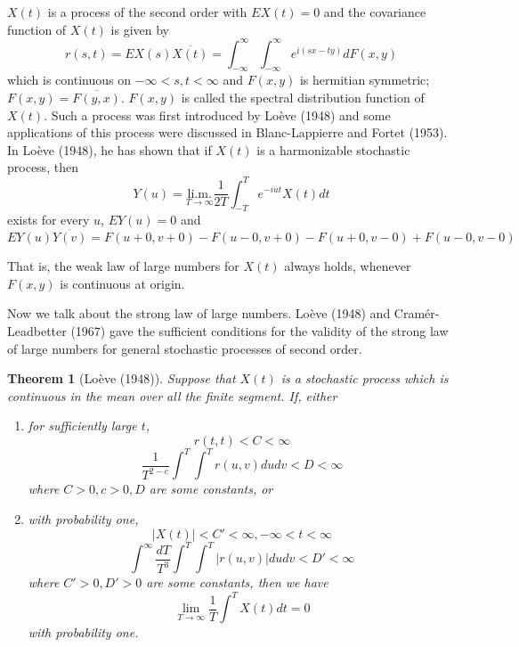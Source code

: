 \documentclass{article}
\newtheorem{theorem}{Theorem}
\newtheorem{enumerate}{Enumerate}
\begin{document}
$X(t)$ is a process of the second order with $EX(t)=0$ and the covariance function of $X(t)$ is given by
\begin{equation}\label{eq:5}
r(s,t) = EX(s)\overline{X(t)} = \int_{-\infty}^{\infty} \int_{-\infty}^{\infty} e^{i(sx-ty)} dF(x,y)
\end{equation}
which is continuous on $-\infty < s,t < \infty$ and $F(x,y)$ is hermitian symmetric; $F(x,y) = \overline{F(y,x)}$. $F(x,y)$ is called the spectral distribution function of $X(t)$. Such a process was first introduced by Loève (1948) and some applications of this process were discussed in Blanc-Lappierre and Fortet (1953). In Loève (1948), he has shown that if $X(t)$ is a harmonizable stochastic process, then
\begin{equation}\label{eq:6}
Y(u)=\underset{T \rightarrow \infty}{\text{li.m.}} \frac{1}{2T} \int_{-T}^{T} e^{-iut} X(t) dt
\end{equation}
exists for every $u$, $EY(u)=0$ and
\begin{equation}\label{eq:7}
EY(u)\overline{Y(v)} = F(u+0,v+0)-F(u-0,v+0)-F(u+0,v-0)+F(u-0,v-0)
\end{equation}

That is, the weak law of large numbers for $X(t)$ always holds, whenever $F(x,y)$ is continuous at origin.

Now we talk about the strong law of large numbers. Loève (1948) and Cramér-Leadbetter (1967) gave the sufficient conditions for the validity of the strong law of large numbers for general stochastic processes of second order.

\begin{theorem}[Loève (1948)]\label{thm:A}
Suppose that $X(t)$ is a stochastic process which is continuous in the mean over all the finite segment. If, either

\begin{enumerate}
\item for sufficiently large $t$,
\begin{equation}\label{eq:8}
r(t,t)<C<\infty
\end{equation}
\begin{equation}\label{eq:9}
\frac{1}{T^{2-c}} \int^{T} \int^{T} r(u,v) dudv<D<\infty
\end{equation}
where $C>0, c>0, D$ are some constants, or

\item with probability one,
\begin{equation}\label{eq:10}
|X(t)|<C'<\infty, -\infty<t<\infty
\end{equation}
\begin{equation}\label{eq:11}
\int^{\infty} \frac{dT}{T^3} \int^{T} \int^{T}|r(u,v)| dudv<D'<\infty
\end{equation}
where $C'>0, D'>0$ are some constants, then we have
\begin{equation}\label{eq:12}
\lim_{T \rightarrow \infty} \frac{1}{T} \int^{T} X(t) dt=0
\end{equation}
with probability one.
\end{enumerate}
\end{theorem}
\end{document}
